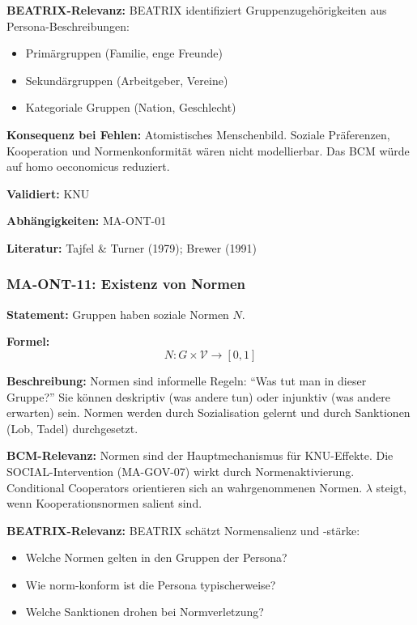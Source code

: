 \textbf{BEATRIX-Relevanz:}
BEATRIX identifiziert Gruppenzugehörigkeiten aus Persona-Beschreibungen:
\begin{itemize}
    \item Primärgruppen (Familie, enge Freunde)
    \item Sekundärgruppen (Arbeitgeber, Vereine)
    \item Kategoriale Gruppen (Nation, Geschlecht)
\end{itemize}

\textbf{Konsequenz bei Fehlen:}
Atomistisches Menschenbild. Soziale Präferenzen, Kooperation und Normenkonformität wären nicht modellierbar. Das BCM würde auf homo oeconomicus reduziert.

\textbf{Validiert:} KNU

\textbf{Abhängigkeiten:} MA-ONT-01

\textbf{Literatur:} Tajfel \& Turner (1979); Brewer (1991)


\subsubsection*{MA-ONT-11: Existenz von Normen}

\textbf{Statement:} Gruppen haben soziale Normen $N$.

\textbf{Formel:}
\begin{equation}
N: G \times \mathcal{V} \rightarrow [0, 1]
\end{equation}

\textbf{Beschreibung:}
Normen sind informelle Regeln: ``Was tut man in dieser Gruppe?'' Sie können deskriptiv (was andere tun) oder injunktiv (was andere erwarten) sein. Normen werden durch Sozialisation gelernt und durch Sanktionen (Lob, Tadel) durchgesetzt.

\textbf{BCM-Relevanz:}
Normen sind der Hauptmechanismus für KNU-Effekte. Die SOCIAL-Intervention (MA-GOV-07) wirkt durch Normenaktivierung. Conditional Cooperators orientieren sich an wahrgenommenen Normen. $\lambda$ steigt, wenn Kooperationsnormen salient sind.

\textbf{BEATRIX-Relevanz:}
BEATRIX schätzt Normensalienz und -stärke:
\begin{itemize}
    \item Welche Normen gelten in den Gruppen der Persona?
    \item Wie norm-konform ist die Persona typischerweise?
    \item Welche Sanktionen drohen bei Normverletzung?
\end{itemize}

